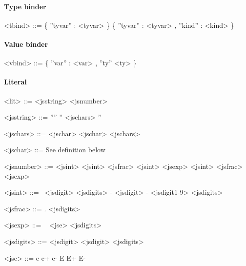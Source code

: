 \paragraph{Type binder}

\begin{grammar}

<tbind>		  ::= 	 \{ ''tyvar'' : <tyvar> \}
		  \alt 	 \{ ''tyvar'' : <tyvar> , ''kind'' : <kind> \}	


\end{grammar}

\paragraph{Value binder}

\begin{grammar}

<vbind>		  ::= 	 \{ ''var'' : <var> , ''ty'' <ty> \} 										 

\end{grammar}

\paragraph{Literal}

\begin{grammar}


<lit>		  ::= 	<jsstring>		 
		  \alt 	<jsnumber>


<jsstring>	  ::= 	 ''''														 
		  \alt 	'' <jschars> ''		
											 
<jschars>	  ::= 	<jschar>
		  \alt 	<jschar> <jschars>
												 
<jschar>	  ::= 	 See definition below

<jsnumber>	  ::=  	<jsint>
		  \alt 	<jsint> <jsfrac>
		  \alt 	<jsint> <jsexp>
		  \alt 	<jsint> <jsfrac> <jsexp>
											 
<jsint>		  ::= 	<jsdigit>
		  \alt  <jsdigit1-9> <jsdigits> 
		  \alt  - <jsdigit>
		  \alt  - <jsdigit1-9> <jsdigits>

<jsfrac> 	  ::=  	. <jsdigits>

<jsexp>		  ::=  	<jse> <jsdigits>

<jsdigits>	  ::=  	<jsdigit> 
		  \alt  <jsdigit> <jsdigits>

<jse>		  ::=  	e
		  \alt  e+		 
		  \alt  e- 		 
		  \alt  E		 
		  \alt  E+		 
		  \alt  E-

\end{grammar}

